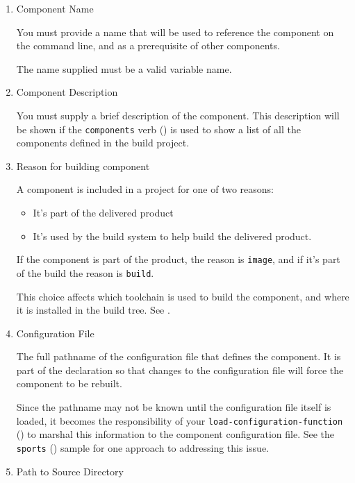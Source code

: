 \begin{enumerate}
\item Component Name

  You must provide a name that will be used to reference the component
  on the \lmsbw command line, and as a prerequisite of other
  components.

  The name supplied must be a valid \makefile variable name.

\item Component Description

  You must supply a brief description of the component.  This
  description will be shown if the \texttt{components} verb
  () is used to show a list of all the
  components defined in the build project.

\item Reason for building component

  A component is included in a project for one of two reasons:

  \begin{itemize}
    \item It's part of the delivered product
    \item It's used by the build system to help build the delivered
      product.
  \end{itemize}

  If the component is part of the product, the reason is
  \texttt{image}, and if it's part of the build the reason is
  \texttt{build}.

  This choice affects which toolchain is used to build the component,
  and where it is installed in the build tree.  See .

\item Configuration File

  The full pathname of the configuration file that defines the
  component.  It is part of the declaration so that changes to the
  configuration file will force the component to be rebuilt.

  Since the pathname may not be known until the configuration file
  itself is loaded, it becomes the responsibility of your
  \texttt{load-configuration-function}
  () to marshal this
  information to the component configuration file.  See the
  \texttt{sports} () sample for one approach to
  addressing this issue.

\item Path to Source Directory


\end{enumerate}

